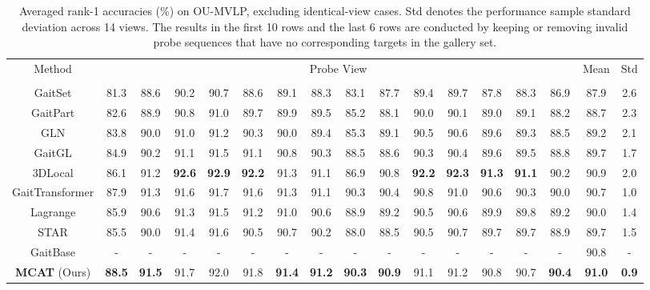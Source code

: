 \documentclass[journal]{IEEEtran}
\begin{document}
\begin{table*}[t]
\begin{center}
\footnotesize
\caption{Averaged rank-1 accuracies (\%) on OU-MVLP, excluding identical-view cases. Std denotes the performance sample standard deviation across 14 views. The results in the first 10 rows and the last 6 rows are conducted by keeping or removing invalid probe sequences that have no corresponding targets in the gallery set.}
\begin{tabular}{|c| c c c c c c c c c c c c c c |c|c|}
\hline
\multirow{2}{*}{Method} & \multicolumn{14}{c|}{Probe View} & \multirow{2}{*}{Mean} & \multirow{2}{*}{Std} \\\cline{2-15}
&  &  &  &  &  &  &  &  &  &  &  &  &  &  & &  \\\hline
GaitSet \cite{chao2021gaitset} & 81.3 & 88.6 & 90.2 & 90.7 & 88.6 & 89.1 & 88.3 & 83.1 & 87.7 & 89.4 & 89.7 & 87.8 & 88.3 & 86.9 & 87.9 & 2.6 \\
GaitPart \cite{fan2020gaitpart} & 82.6 & 88.9 & 90.8 & 91.0 & 89.7 & 89.9 & 89.5 & 85.2 & 88.1 & 90.0 & 90.1 & 89.0 & 89.1 & 88.2 & 88.7 & 2.3 \\
GLN \cite{hou2020gait} & 83.8 & 90.0 & 91.0 & 91.2 & 90.3 & 90.0 & 89.4 & 85.3 & 89.1 & 90.5 & 90.6 & 89.6 & 89.3 & 88.5 & 89.2 & 2.1 \\
GaitGL \cite{GaitGL} & 84.9 & 90.2 & 91.1 & 91.5 & 91.1 & 90.8 & 90.3 & 88.5 & 88.6 & 90.3 & 90.4 & 89.6 & 89.5 & 88.8 & 89.7 & 1.7 \\
3DLocal \cite{local3D} & 86.1 & 91.2 & \textbf{92.6} & \textbf{92.9} & \textbf{92.2} & 91.3 & 91.1 & 86.9 & 90.8 & \textbf{92.2} & \textbf{92.3} & \textbf{91.3} & \textbf{91.1} & 90.2 & 90.9 & 2.0 \\
GaitTransformer \cite{cui2022gaittransformer} & 87.9 & 91.3 & 91.6 & 91.7 & 91.6 & 91.3 & 91.1 & 90.3 & 90.4 & 90.8 & 91.0 & 90.6 & 90.3 & 90.0 & 90.7 & 1.0 \\
Lagrange \cite{chai2022lagrange} & 85.9 & 90.6 & 91.3 & 91.5 & 91.2 & 91.0 & 90.6 & 88.9 & 89.2 & 90.5 & 90.6 & 89.9 & 89.8 & 89.2 & 90.0 & 1.4 \\
STAR \cite{huang2022star} & 85.5 & 90.0 & 91.4 & 91.6 & 90.5 & 90.7 & 90.2 & 88.0 & 88.5 & 90.5 & 90.7 & 89.7 & 89.7 & 88.9 & 89.7 & 1.5 \\
GaitBase \cite{fan2023opengait} & - & - & - & - & - & - & - & - & - & - & - & - & - & - & 90.8 & -\\
\textbf{MCAT} (Ours) & \textbf{88.5} & \textbf{91.5} & 91.7 & 92.0 & 91.8 & \textbf{91.4} & \textbf{91.2} & \textbf{90.3} & \textbf{90.9} & 91.1 & 91.2 & 90.8 & 90.7 & \textbf{90.4} & \textbf{91.0} & \textbf{0.9}  \\\hline \hline

\end{tabular}
\end{center}
\end{table*}
\end{document}
